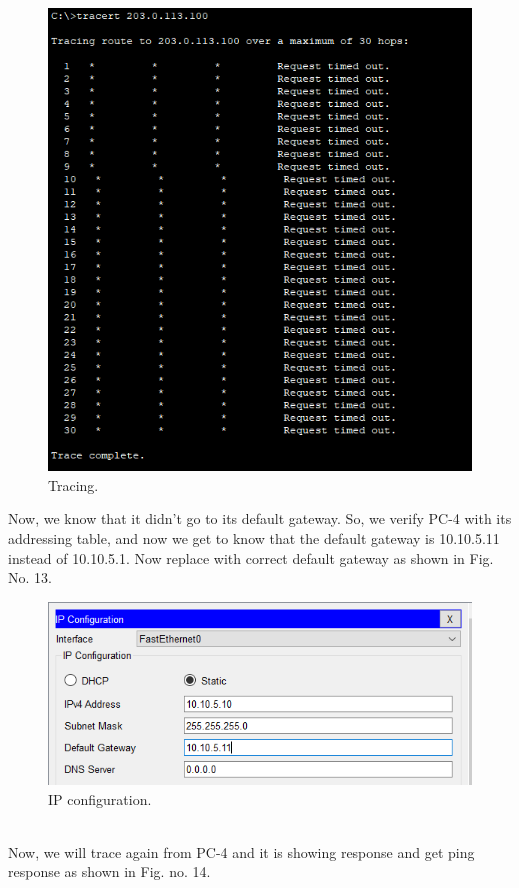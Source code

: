 \documentclass[12pt,a4paper]{article}
\begin{document}
\begin{figure}[h]
 		\centering
				\includegraphics[scale=0.75]{5.3.png}	


			\caption{Tracing.}
			\label{fig:AP}
	\end{figure}
Now, we know that it didn't go to its default gateway.
So, we verify PC-4 with its addressing table, and now we get to know that the default gateway is 10.10.5.11 instead of 10.10.5.1. Now replace with correct default gateway as shown in Fig. No. 13.\\
\begin{figure}[h]
 		\centering
				\includegraphics[scale=0.75]{5.4.png}	


			\caption{IP configuration.}
			\label{fig:AP}
	\end{figure}
\pagebreak \\
Now, we will trace again from PC-4 and it is showing response  and get ping response as shown in Fig. no. 14.\\
\end{document}
